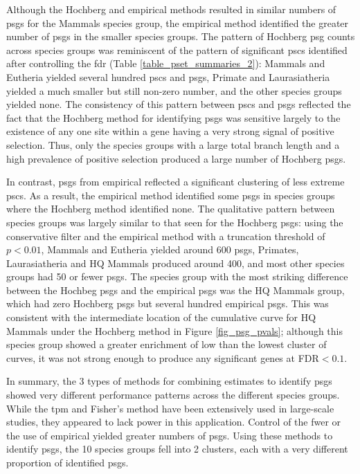 Although the Hochberg and empirical methods resulted in similar
numbers of \acp{psg} for the Mammals species group, the empirical
method identified the greater number of \acp{psg} in the smaller
species groups. The pattern of Hochberg \ac{psg} counts across species
groups was reminiscent of the pattern of significant \acp{psc}
identified after controlling the \ac{fdr} (Table
\ref{table_pset_summaries_2}): Mammals and Eutheria yielded several
hundred \acp{psc} and \acp{psg}, Primate and Laurasiatheria yielded a
much smaller but still non-zero number, and the other species groups
yielded none. The consistency of this pattern between \acp{psc} and
\acp{psg} reflected the fact that the Hochberg method for identifying
\acp{psg} was sensitive largely to the existence of any one site
within a gene having a very strong signal of positive selection. Thus,
only the species groups with a large total branch length and a high
prevalence of positive selection produced a large number of Hochberg
\acp{psg}.

In contrast, \acp{psg} from empirical \pvs reflected a significant
clustering of less extreme \acp{psc}. As a result, the empirical
method identified some \acp{psg} in species groups where the Hochberg
method identified none. The qualitative pattern between species groups
was largely similar to that seen for the Hochberg \acp{psg}: using the
conservative filter and the empirical method with a truncation
threshold of $p<0.01$, Mammals and Eutheria yielded around 600
\acp{psg}, Primates, Laurasiatheria and HQ Mammals produced around
400, and most other species groups had 50 or fewer \acp{psg}. The
species group with the most striking difference between the Hochbeg
\acp{psg} and the empirical \acp{psg} was the HQ Mammals group, which
had zero Hochberg \acp{psg} but several hundred empirical
\acp{psg}. This was consistent with the intermediate location of the
cumulative curve for HQ Mammals under the Hochberg method in Figure
\ref{fig_psg_pvals}; although this species group showed a greater
enrichment of low \pvs than the lowest cluster of curves, it was
not strong enough to produce any significant genes at FDR$<0.1$.

In summary, the 3 types of methods for combining \sw estimates to
identify \acp{psg} showed very different performance patterns across
the different species groups. While the \ac{tpm} and Fisher's method
have been extensively used in large-scale studies, they appeared to
lack power in this application. Control of the \ac{fwer} or the use of
empirical \pvs yielded greater numbers of \acp{psg}. Using these
methods to identify \acp{psg}, the 10 species groups fell into 2
clusters, each with a very different proportion of identified
\acp{psg}.

